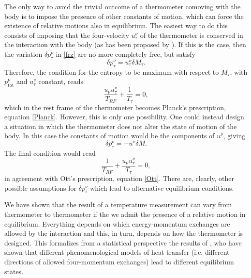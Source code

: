 \documentclass[twocolumn,usenatbib]{mnras2}
\begin{document}
The only way to avoid the trivial outcome of a thermometer comoving with the body is to impose the presence of other constants of motion, which can force the existence of relative motions also in equilibrium. The easiest way to do this consists of imposing that the four-velocity $u_\tau^\nu$ of the thermometer is conserved in the interaction with the body (as has been proposed by \citealt{Becattini2016}). If this is the case, then the variation $\delta p_\tau^\nu$ in \eqref{frz} are no more completely free, but satisfy
\begin{equation}\label{PPPPPPlan}
\delta p_\tau^\nu = u_\tau^\nu \delta M_\tau .
\end{equation}
Therefore, the condition for the entropy to be maximum with respect to $M_\tau$, with $p_{\text{tot}}^\nu$ and $u_\tau^\nu$ constant, reads
\begin{equation}
\dfrac{u_\nu u_\tau^\nu}{T_{RF}} + \dfrac{1}{T_\tau} =0,
\end{equation}
which in the rest frame of the thermometer becomes Planck's prescription, equation \eqref{Planck}. However, this is only one possibility. One could instead design a situation in which the thermometer does not alter the state of motion of the body. In this case the constants of motion would be the components of $u^\nu$, giving
\begin{equation}\label{OOOOOOttt}
\delta p_\tau^\nu = -u^\nu \delta M .
\end{equation}
The final condition would read
\begin{equation}
\dfrac{1}{T_{RF}} + \dfrac{u_\nu u_\tau^\nu}{T_\tau} =0,
\end{equation}
in agreement with Ott's prescription, equation \eqref{Ott}. There are, clearly, other possible assumptions for $\delta p_\tau^\nu$ which lead to alternative equilibrium conditions.

We have shown that the result of a temperature measurement can vary from thermometer to thermometer if the we admit the presence of a relative motion in equilibrium. Everything depends on which energy-momentum exchanges are allowed by the interaction and this, in turn, depends on how the thermometer is designed. This formalizes from a statistical perspective the results of \cite{Biro2010}, who have shown that different phenomenological models of heat transfer (i.e. different directions of allowed four-momentum exchanges) lead to different equilibrium states.
\end{document}

